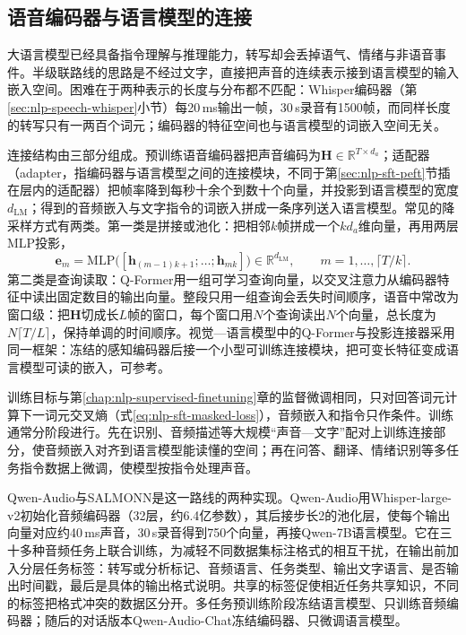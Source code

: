 \subsection{语音编码器与语言模型的连接}
\label{sec:nlp-speech-llm-connector}

大语言模型已经具备指令理解与推理能力，转写却会丢掉语气、情绪与非语音事件。半级联路线的思路是不经过文字，直接把声音的连续表示接到语言模型的输入嵌入空间。困难在于两种表示的长度与分布都不匹配：Whisper编码器（第\ref{sec:nlp-speech-whisper}小节）每20\,ms输出一帧，30\,s录音有1500帧，而同样长度的转写只有一两百个词元；编码器的特征空间也与语言模型的词嵌入空间无关。

连接结构由三部分组成。预训练语音编码器把声音编码为$\bm H\in\mathbb R^{T\times d_a}$；适配器（adapter，指编码器与语言模型之间的连接模块，不同于第\ref{sec:nlp-sft-peft}节插在层内的适配器）把帧率降到每秒十余个到数十个向量，并投影到语言模型的宽度$d_{\mathrm{LM}}$；得到的音频嵌入与文字指令的词嵌入拼成一条序列送入语言模型。常见的降采样方式有两类。第一类是拼接或池化：把相邻$k$帧拼成一个$k d_a$维向量，再用两层MLP投影，
\begin{equation}
 \bm e_m=\mathrm{MLP}\bigl([\bm h_{(m-1)k+1};\ldots;\bm h_{mk}]\bigr)\in\mathbb R^{d_{\mathrm{LM}}},\qquad m=1,\ldots,\lceil T/k\rceil.
 \label{eq:nlp-speech-adapter-stack}
\end{equation}
第二类是查询读取：Q-Former用一组可学习查询向量，以交叉注意力从编码器特征中读出固定数目的输出向量。整段只用一组查询会丢失时间顺序，语音中常改为窗口级：把$\bm H$切成长$L$帧的窗口，每个窗口用$N$个查询读出$N$个向量，总长度为$N\lceil T/L\rceil$，保持单调的时间顺序。视觉—语言模型中的Q-Former与投影连接器采用同一框架：冻结的感知编码器后接一个小型可训练连接模块，把可变长特征变成语言模型可读的嵌入，可参考。

训练目标与第\ref{chap:nlp-supervised-finetuning}章的监督微调相同，只对回答词元计算下一词元交叉熵（式\eqref{eq:nlp-sft-masked-loss}），音频嵌入和指令只作条件。训练通常分阶段进行。先在识别、音频描述等大规模“声音—文字”配对上训练连接部分，使音频嵌入对齐到语言模型能读懂的空间；再在问答、翻译、情绪识别等多任务指令数据上微调，使模型按指令处理声音。

Qwen-Audio与SALMONN是这一路线的两种实现\cite{nlp-speech-chu2023qwenaudio,nlp-speech-tang2024salmonn}。Qwen-Audio用Whisper-large-v2初始化音频编码器（32层，约6.4亿参数），其后接步长2的池化层，使每个输出向量对应约40\,ms声音，30\,s录音得到750个向量，再接Qwen-7B语言模型。它在三十多种音频任务上联合训练，为减轻不同数据集标注格式的相互干扰，在输出前加入分层任务标签：转写或分析标记、音频语言、任务类型、输出文字语言、是否输出时间戳，最后是具体的输出格式说明。共享的标签促使相近任务共享知识，不同的标签把格式冲突的数据区分开。多任务预训练阶段冻结语言模型、只训练音频编码器；随后的对话版本Qwen-Audio-Chat冻结编码器、只微调语言模型。

